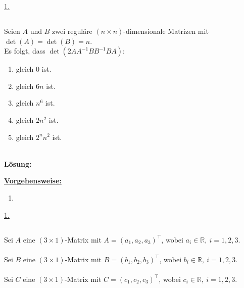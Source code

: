 \underline{1.}\\



\newpage
\subsection*{}
Seien $A$ und $B$ zwei reguläre $(n \times n)$-dimensionale Matrizen mit $\det(A) = \det(B) = n$.\\
Es folgt, dass $\det(2AA^{-1} B B^{-1} B A)$:
\renewcommand{\labelenumi}{(\alph{enumi})}
\begin{enumerate}
	\item 
	gleich $0$ ist.
	\item
	gleich $6n$ ist.
	\item
	gleich $n^6$ ist.
	\item
	gleich $2 n^2$ ist.
	\item
	gleich $2^n n^2$ ist.
\end{enumerate}
\ \\
\textbf{Lösung:}
\begin{mdframed}
\underline{\textbf{Vorgehensweise:}}
\renewcommand{\labelenumi}{\theenumi.}
\begin{enumerate}
\item 
\end{enumerate}
\end{mdframed}

\underline{1. }\\

\newpage

\subsection*{}
Sei $ A $ eine $ (3 \times 1) $-Matrix mit $A = (a_1, a_2, a_3)^\top$, wobei $ a_i \in \mathbb{R}, \ i = 1,2,3$.\\
\\
Sei $ B $ eine $ (3 \times 1) $-Matrix mit $B = (b_1, b_2, b_3)^\top$, wobei $ b_i \in \mathbb{R}, \ i = 1,2,3$.\\
\\
Sei $ C $ eine $ (3 \times 1) $-Matrix mit $C = (c_1, c_2, c_3)^\top$, wobei $ c_i \in \mathbb{R}, \ i = 1,2,3$.\\

